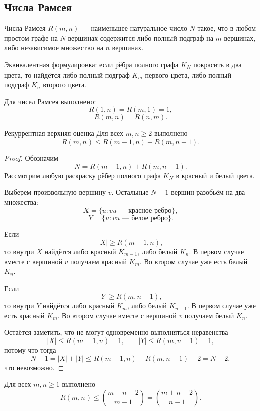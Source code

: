 \subsection{Числа Рамсея}

\begin{Definition}{Числа Рамсея}{}
	$R(m,n)$ — наименьшее натуральное число $N$ такое, что в любом простом графе на $N$
	вершинах содержится либо полный подграф на $m$ вершинах, либо независимое множество
	на $n$ вершинах.
	
	Эквивалентная формулировка: если рёбра полного графа $K_N$ покрасить в два цвета,
	то найдётся либо полный подграф $K_m$ первого цвета, либо полный подграф $K_n$ второго цвета.
\end{Definition}

\begin{Proposition}{}{}
	Для чисел Рамсея выполнено:
	\[
	R(1,n)=R(m,1)=1,
	\]
	\[
	R(m,n)=R(n,m).
	\]
\end{Proposition}

\begin{Theorem}{Рекуррентная верхняя оценка}{}
	Для всех $m,n\ge 2$ выполнено
	\[
	R(m,n)\le R(m-1,n)+R(m,n-1).
	\]
\end{Theorem}

\begin{proof}
	Обозначим
	\[
	N=R(m-1,n)+R(m,n-1).
	\]
	Рассмотрим любую раскраску рёбер полного графа $K_N$ в красный и белый цвета.
	
	Выберем произвольную вершину $v$.
	Остальные $N-1$ вершин разобьём на два множества:
	\[
	X=\{u : vu \text{ — красное ребро}\},
	\]
	\[
	Y=\{u : vu \text{ — белое ребро}\}.
	\]
	
	Если
	\[
	|X|\ge R(m-1,n),
	\]
	то внутри $X$ найдётся либо красный $K_{m-1}$, либо белый $K_n$.
	В первом случае вместе с вершиной $v$ получаем красный $K_m$.
	Во втором случае уже есть белый $K_n$.
	
	Если
	\[
	|Y|\ge R(m,n-1),
	\]
	то внутри $Y$ найдётся либо красный $K_m$, либо белый $K_{n-1}$.
	В первом случае уже есть красный $K_m$.
	Во втором случае вместе с вершиной $v$ получаем белый $K_n$.
	
	Остаётся заметить, что не могут одновременно выполняться неравенства
	\[
	|X|\le R(m-1,n)-1,
	\qquad
	|Y|\le R(m,n-1)-1,
	\]
	потому что тогда
	\[
	N-1=|X|+|Y|
	\le
	R(m-1,n)+R(m,n-1)-2
	=
	N-2,
	\]
	что невозможно.
\end{proof}

\begin{Corollary}{}{}
	Для всех $m,n\ge 1$ выполнено
	\[
	R(m,n)\le \binom{m+n-2}{m-1}
	=
	\binom{m+n-2}{n-1}.
	\]
\end{Corollary}

